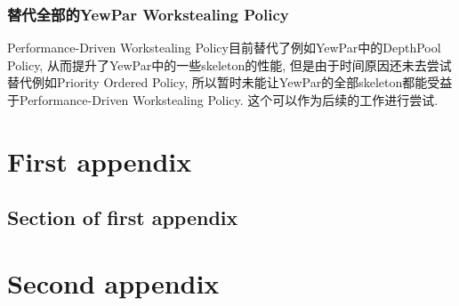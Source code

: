 \documentclass{mproj}
\begin{document}
\subsection{替代全部的YewPar Workstealing Policy}

Performance-Driven Workstealing Policy目前替代了例如YewPar中的DepthPool Policy,
从而提升了YewPar中的一些skeleton的性能,
但是由于时间原因还未去尝试替代例如Priority Ordered Policy,
所以暂时未能让YewPar的全部skeleton都能受益于Performance-Driven Workstealing Policy.
这个可以作为后续的工作进行尝试.


\appendix %
\chapter{First appendix}

\section{Section of first appendix}

\chapter{Second appendix}



\end{document}
